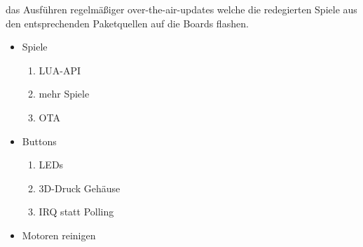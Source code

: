 \documentclass[a4paper]{article}
\begin{document}
  das Ausführen regelmäßiger over-the-air-updates welche die redegierten Spiele
  aus den entsprechenden Paketquellen auf die Boards flashen.
  \begin{itemize}
    \item Spiele
    \begin{enumerate}
      \item LUA-API
      \item mehr Spiele
      \item OTA
    \end{enumerate}
    \item Buttons
    \begin{enumerate}
      \item LEDs
      \item 3D-Druck Gehäuse
      \item IRQ statt Polling
    \end{enumerate}
    \item Motoren reinigen
  \end{itemize}
\end{document}
